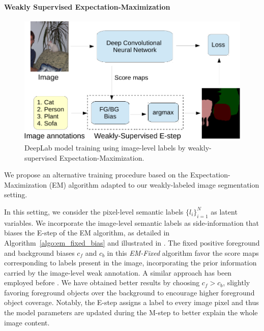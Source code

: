 \paragraph{Weakly Supervised Expectation-Maximization}

\begin{figure}[tbp!]
  \centering
  \includegraphics[width=0.9\linewidth]{fig/model_train_image.pdf} 
  \caption{DeepLab model training using image-level labels by
    weakly-supervised Expectation-Maximization.}
  \label{fig:model_train_image}
\end{figure}

We propose an alternative training procedure based on the
Expectation-Maximization (EM) algorithm adapted to our weakly-labeled
image segmentation setting.

In this setting, we consider the pixel-level semantic labels
$\{l_i\}_{i=1}^N$ as latent variables. We incorporate the image-level
semantic labels as side-information that biases the E-step of the EM
algorithm, as detailed in Algorithm~\ref{algo:em_fixed_bias} and
illustrated in . The fixed positive
foreground and background biases $c_f$ and $c_b$ in this
\textsl{EM-Fixed} algorithm favor the score maps corresponding to
labels present in the image, incorporating the prior information
carried by the image-level weak annotation. A similar approach has
been employed before \citep{Lu2013sports, cour2011learning}. We have
obtained better results by choosing $c_f > c_b$, slightly favoring
foreground objects over the background to encourage higher foreground
object coverage. Notably, the E-step assigns a label to every image
pixel and thus the model parameters are updated during the M-step to
better explain the whole image content.

